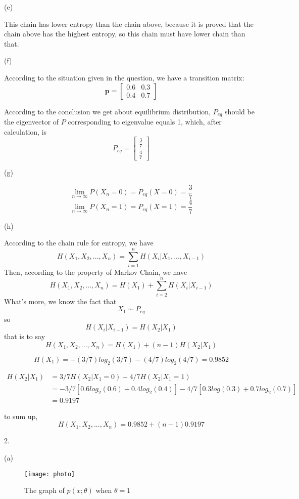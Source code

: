 \documentclass[10pt]{article}
\begin{document}
(e)


This chain has lower entropy than the chain above, because it is proved that the chain above has the highest entropy, so this chain must have lower chain than that.


(f)


According to the situation given in the question, we have a transition matrix:
$$\textbf{p}=
\begin{bmatrix}
0.6&0.3\\0.4&0.7
\end{bmatrix}
$$

According to the conclusion we get about equilibrium distribution, $P_{eq}$ should be the eigenvector of $P$ corresponding to eigenvalue equals 1, which, after calculation, is
$$
P_{eq}=
\begin{bmatrix}
\frac{3}{7}\\  \frac{4}{7}
\end{bmatrix}
$$


(g)


$$\lim_{n\to\infty}P(X_n=0)=P_{eq}(X=0)=\frac{3}{7}$$
$$\lim_{n\to\infty}P(X_n=1)=P_{eq}(X=1)=\frac{4}{7}$$



(h)

According to the chain rule for entropy, we have $$H(X_1,X_2,...,X_n)=\sum_{i=1}^{n} H(X_i\vert X_1,...,X_{i-1})$$Then, according to the property of Markov Chain, we have  $$H(X_1,X_2,...,X_n)=H(X_1)+\sum_{i=2}^{n} H(X_i\vert X_{i-1})$$What's more, we know the fact that $$X_1\sim P_{eq}$$so $$H(X_i\vert X_{i-1})=H(X_2\vert X_{1})$$that is to say$$H(X_1,X_2,...,X_n)=H(X_1)+(n-1)H(X_2\vert X_{1})$$

$$H(X_1)=-(3/7)log_2(3/7)-(4/7)log_2(4/7)=0.9852$$

\begin{align}
H(X_2\vert X_1)&=3/7H(X_2 \vert X_1=0)+4/7H(X_2 \vert X_1=1)\nonumber\\
&=-3/7[0.6log_2(0.6)+0.4log_2(0.4)]-4/7[0.3log(0.3)+0.7log_2(0.7)]\nonumber\\
&=0.9197\nonumber
\end{align}

to sum up,
$$H(X_1,X_2,...,X_n)=0.9852+(n-1)0.9197$$



2.

(a)

\begin{figure}[htbp]%
\centering
\texttt{[image: photo]}
\caption{The graph of $p(x; \theta)$ when $\theta=1$}
\label{fig:anna}
\end{figure}
\end{document}
